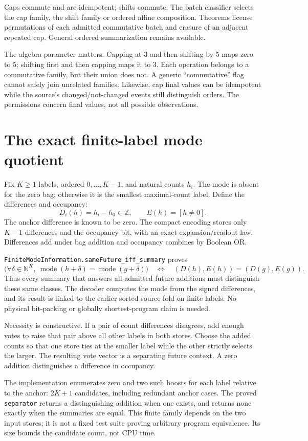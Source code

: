 \documentclass[11pt,a4paper]{article}
\newcommand{\code}[1]{\nolinkurl{#1}}
\begin{document}
Caps commute and are idempotent; shifts commute. The batch classifier selects
the cap family, the shift family or ordered affine composition. Theorems
license permutations of each admitted commutative batch and erasure of an
adjacent repeated cap. General ordered summarization remains available.

The algebra parameter matters. Capping at 3 and then shifting by 5 maps zero
to 5; shifting first and then capping maps it to 3. Each operation belongs to
a commutative family, but their union does not. A generic ``commutative'' flag
cannot safely join unrelated families. Likewise, cap final values can be
idempotent while the source's changed/not-changed events still distinguish
orders. The permissions concern final values, not all possible observations.

\section{The exact finite-label mode quotient}

Fix $K\ge1$ labels, ordered $0,\ldots,K-1$, and natural counts $h_i$. The mode
is absent for the zero bag; otherwise it is the smallest maximal-count label.
Define the differences and occupancy:
\[
 D_i(h)=h_i-h_0\in\mathbb Z,\qquad E(h)=[h\ne0].
\]
The anchor difference is known to be zero. The compact encoding stores only
$K-1$ differences and the occupancy bit, with an exact expansion/readout law.
Differences add under bag addition and occupancy combines by Boolean OR.

\code{FiniteModeInformation.sameFuture_iff_summary} proves
\[
 \bigl(\forall\delta\in\mathbb N^K,\
       \operatorname{mode}(h+\delta)=\operatorname{mode}(g+\delta)\bigr)
 \quad\Longleftrightarrow\quad (D(h),E(h))=(D(g),E(g)).
\]
Thus every summary that answers all admitted future additions must distinguish
these same classes. The decoder computes the mode from the signed differences,
and its result is linked to the earlier sorted source fold on finite labels.
No physical bit-packing or globally shortest-program claim is needed.

Necessity is constructive. If a pair of count differences disagrees, add enough
votes to raise that pair above all other labels in both stores. Choose the
added counts so that one store ties at the smaller label while the other
strictly selects the larger. The resulting vote vector is a separating future
context. A zero addition distinguishes a difference in occupancy.

The implementation enumerates zero and two such boosts for each label relative
to the anchor: $2K+1$ candidates, including redundant anchor cases. The proved
\code{separator} returns a distinguishing addition when one exists, and
returns none exactly when the summaries are equal. This finite family depends
on the two input stores; it is not a fixed test suite proving arbitrary program
equivalence. Its size bounds the candidate count, not CPU time.
\end{document}
